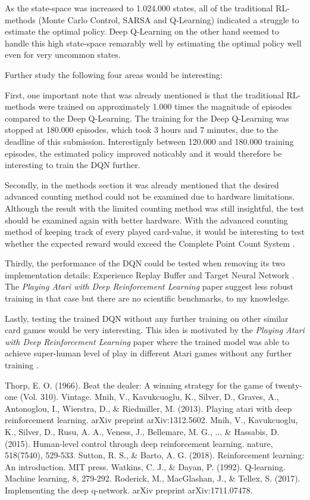 \documentclass[conference]{IEEEtran}
\begin{document}
As the state-space was increased to 1.024.000 states, all of the traditional RL-methods (Monte Carlo Control, SARSA and Q-Learning) indicated a struggle to estimate the optimal policy.
Deep Q-Learning on the other hand seemed to handle this high state-space remarably well by estimating the optimal policy well even for very uncommon states.

Further study the following four areas would be interesting:

First, one important note that was already mentioned is that the traditional RL-methods were trained on approximately 1.000 times the magnitude of episodes compared to the Deep Q-Learning.
The training for the Deep Q-Learning was stopped at 180.000 episodes, which took 3 hours and 7 minutes, due to the deadline of this submission.
Interestignly between 120.000 and 180.000 training episodes, the estimated policy improved noticably and it would therefore be interesting to train the DQN further. 

Secondly, in the methods section it was already mentioned that the desired advanced counting method could not be examined due to hardware limitations. 
Although the result with the limited counting method was still insightful, the test should be examined again with better hardware.
With the advanced counting method of keeping track of every played card-value, it would be interesting to test whether the expected reward would exceed the Complete Point Count System \cite{b1}.

Thirdly, the performance of the DQN could be tested when removing its two implementation details: Experience Replay Buffer and Target Neural Network \cite{b2}.
The \textit{Playing Atari with Deep Reinforcement Learning} paper \cite{b2} suggest less robust training in that case but there are no scientific benchmarks, to my knowledge.

Lastly, testing the trained DQN without any further training on other similar card games would be very interesting.
This idea is motivated by the \textit{Playing Atari with Deep Reinforcement Learning} paper where the trained model was able to achieve super-human level of play in different Atari games without any further training \cite{b2}. 


\begin{thebibliography}{00}
 Thorp, E. O. (1966). Beat the dealer: A winning strategy for the game of twenty-one (Vol. 310). Vintage.
 Mnih, V., Kavukcuoglu, K., Silver, D., Graves, A., Antonoglou, I., Wierstra, D., \& Riedmiller, M. (2013). Playing atari with deep reinforcement learning. arXiv preprint arXiv:1312.5602.
 Mnih, V., Kavukcuoglu, K., Silver, D., Rusu, A. A., Veness, J., Bellemare, M. G., ... \& Hassabis, D. (2015). Human-level control through deep reinforcement learning. nature, 518(7540), 529-533.
 Sutton, R. S., \& Barto, A. G. (2018). Reinforcement learning: An introduction. MIT press.
 Watkins, C. J., \& Dayan, P. (1992). Q-learning. Machine learning, 8, 279-292.
 Roderick, M., MacGlashan, J., \& Tellex, S. (2017). Implementing the deep q-network. arXiv preprint arXiv:1711.07478.
\end{thebibliography}
\end{document}
